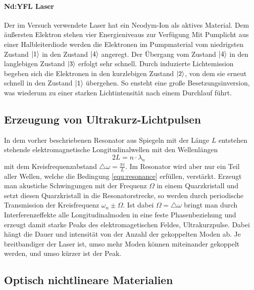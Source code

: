 \paragraph{Nd:YFL Laser}
Der im Versuch verwendete Laser hat ein Neodym-Ion als aktives Material.
Dem äußersten Elektron stehen vier Energieniveaus zur Verfügung
Mit Pumplicht aus einer Halbleiterdiode werden die Elektronen im Pumpmaterial
vom niedrigsten Zustand $\ket{1}$ in den Zustand $\ket{4}$ angeregt. Der Übergang
vom Zustand $\ket{4}$ in den langlebigen Zustand $\ket{3}$ erfolgt sehr
schnell. Durch induzierte Lichtemission begeben sich die Elektronen in den kurzlebigen
Zustand $\ket{2}$, von dem sie erneut schnell in den Zustand $\ket{1}$ übergehen.
So ensteht eine große Besetzungsinversion, was wiederum zu einer starken Lichtintensität
nach einem Durchlauf führt.

\subsection{Erzeugung von Ultrakurz-Lichtpulsen}
In dem vorher beschriebenen Resonator aus Spiegeln mit der Länge $L$
entstehen stehende elektromagnetische Longitudinalwellen mit den Wellenlängen
\begin{equation}
  2L = n \cdot \lambda_n
  \label{equ:resonance}
\end{equation}
mit dem Kreisfrequenzabstand $\triangle \omega = \frac{\pi c}{L}$. 
Im Resonator wird aber nur ein Teil aller Wellen, welche die Bedingung \ref{equ:resonance}
erfüllen, verstärkt. 
Erzeugt man akustiche Schwingungen mit der Frequenz $\Omega$ in einem Quarzkristall
und setzt diesen Quarzkristall in die Resonatorstrecke, so werden durch periodische Transmission
der Kreisfrequenz $\omega_n \pm \Omega$. Ist dabei $\Omega = \triangle \omega$
bringt man durch Interferenzeffekte alle Longitudinalmoden in eine feste Phasenbeziehung
und erzeugt damit starke Peaks des elektromagetischen Feldes, Ultrakurzpulse.
Dabei hängt die Dauer und intensität von der Anzahl der gekoppelten Moden ab.
Je breitbandiger der Laser ist, umso mehr Moden können miteinander gekoppelt werden,
und umso kürzer ist der Peak.

\subsection{Optisch nichtlineare Materialien}
